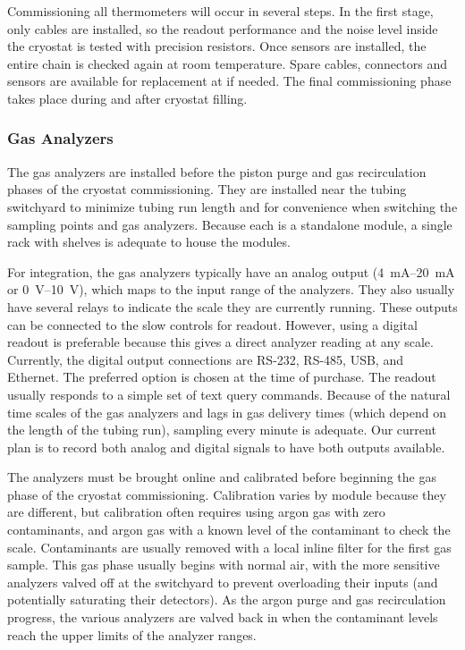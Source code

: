 Commissioning all thermometers will occur in several steps. In the first stage, only cables %
are installed, so
the readout performance and the noise level inside the cryostat %
is tested with precision resistors. Once sensors are installed, the entire chain %
is checked again at room temperature.
Spare cables, connectors and sensors are available for replacement at  if needed. 
The final commissioning phase %
takes place during and after cryostat filling.  


\subsubsection{Gas Analyzers}
\label{sec:fdgen-slow-cryo-install-ga}

The gas analyzers %
are installed before the piston purge and gas recirculation phases of the cryostat commissioning. They %
are installed near the tubing switchyard to minimize tubing run length and for convenience when switching the sampling points and gas analyzers. Because each is a standalone module, a single rack with shelves %
is adequate to house the modules.

For integration, the gas analyzers typically have an analog output (\SIrange{4}{20}{mA} or \SIrange{0}{10}{V}), which maps to the input range of the analyzers. They also usually have several relays to indicate the scale they are currently running. These outputs can be connected to the slow controls for readout. However, using a digital readout is preferable because this gives a direct analyzer reading at any scale. Currently, the digital output connections are RS-232, RS-485, USB, and Ethernet. The preferred option is chosen at the time of purchase. 
The readout usually responds to a simple set of text query commands. Because of the natural time scales of the gas analyzers and lags in gas delivery times (which depend on the length of the tubing run), sampling every minute is adequate. Our current plan is to record both analog and digital signals to have both outputs available.  

The analyzers %
must be brought online and calibrated before beginning the gas phase of the cryostat commissioning.  Calibration varies by module because they are different, but calibration often requires using argon gas with zero contaminants, and argon gas with a known level of the contaminant to check the scale. Contaminants are usually removed with a local inline filter for the first gas sample. %
This gas phase usually begins with normal air, with the more sensitive analyzers valved off at the switchyard to prevent overloading their inputs (and potentially saturating their detectors). As the argon purge and gas recirculation progress, the various analyzers %
are valved back in when the contaminant levels reach the upper limits of the analyzer ranges. 

